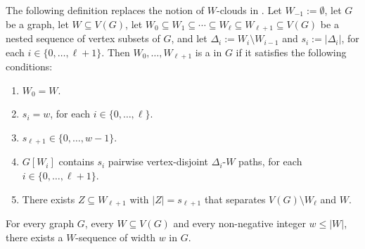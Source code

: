 \documentclass{patmorin}
\newcommand{\pat}[1]{\textcolor{Blue}{[Pat: #1]}}
\newcommand{\hussein}[1]{\textcolor{purple}{HH: #1}}
\begin{document}

The following definition replaces the notion of $W$-clouds in \cite{dvorak.norin:treewidth}.
Let $W_{-1}:=\emptyset$, let $G$ be a graph, let $W\subseteq V(G)$, let $W_0\subseteq W_1\subseteq\cdots\subseteq W_{\ell}\subseteq W_{\ell+1}\subseteq V(G)$ be a nested sequence of vertex subsets of $G$, and let $\Delta_i:=W_{i}\setminus W_{i-1}$ and $s_i:=|\Delta_i|$, for each $i\in\{0,\ldots,\ell+1\}$.  Then $W_0,\ldots,W_{\ell+1}$ is a  in $G$ if it satisfies the following conditions:
\begin{enumerate}[nosep,nolistsep,label=\rm(\alph*),ref=(\alph*)]
  \item $W_0=W$.\label{w_starts}
  \item $s_i=w$, for each $i\in\{0,\ldots,\ell\}$.\label{uniform_size}
  \item $s_{\ell+1}\in\{0,\ldots,w-1\}$.\label{remainder}
  \item $G[W_i]$ contains $s_i$  pairwise vertex-disjoint $\Delta_i$-$W$ paths, for each $i\in\{0,\ldots,\ell+1\}$.\label{linked}
  \item There exists $Z\subseteq W_{\ell+1}$ with $|Z|=s_{\ell+1}$ that separates $V(G)\setminus W_{\ell}$ and $W$. \label{separated}
\end{enumerate}



\begin{lem}\label{w_sequence}
  For every graph $G$, every $W\subseteq V(G)$ and every non-negative integer $w\le |W|$, there exists a $W$-sequence of width $w$ in $G$.
\end{lem}
\end{document}

